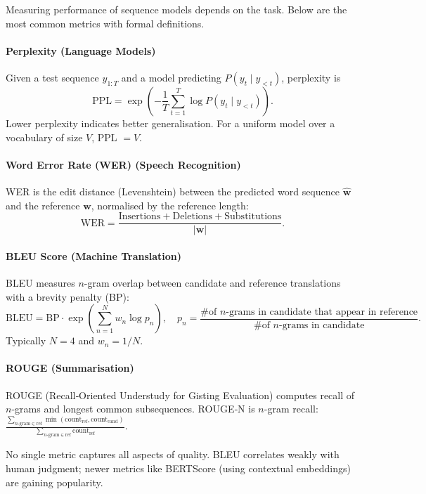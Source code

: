 \documentclass{tufte-handout}
\begin{document}
Measuring performance of sequence models depends on the task. Below are the most common metrics with formal definitions.

\paragraph{Perplexity (Language Models)}
Given a test sequence $y_{1:T}$ and a model predicting $P(y_t \mid y_{<t})$, perplexity is
\[
\text{PPL} = \exp\left(-\frac{1}{T}\sum_{t=1}^T \log P(y_t \mid y_{<t})\right).
\]
Lower perplexity indicates better generalisation. For a uniform model over a vocabulary of size $V$, PPL $= V$.

\paragraph{Word Error Rate (WER) (Speech Recognition)}
WER is the edit distance (Levenshtein) between the predicted word sequence $\hat{\mathbf{w}}$ and the reference $\mathbf{w}$, normalised by the reference length:
\[
\text{WER} = \frac{\text{Insertions} + \text{Deletions} + \text{Substitutions}}{|\mathbf{w}|}.
\]

\paragraph{BLEU Score (Machine Translation)}
BLEU measures $n$-gram overlap between candidate and reference translations with a brevity penalty (BP):
\[
\text{BLEU} = \text{BP} \cdot \exp\left(\sum_{n=1}^N w_n \log p_n\right),\quad
p_n = \frac{\text{\# of $n$-grams in candidate that appear in reference}}{\text{\# of $n$-grams in candidate}}.
\]
Typically $N=4$ and $w_n = 1/N$.

\paragraph{ROUGE (Summarisation)}
ROUGE (Recall‑Oriented Understudy for Gisting Evaluation) computes recall of $n$-grams and longest common subsequences. ROUGE‑N is $n$-gram recall: $\frac{\sum_{n\text{-gram} \in \text{ref}} \min(\text{count}_{\text{ref}}, \text{count}_{\text{cand}})}{\sum_{n\text{-gram} \in \text{ref}} \text{count}_{\text{ref}}}$.

\begin{remark}
    No single metric captures all aspects of quality. BLEU correlates weakly with human judgment; newer metrics like BERTScore (using contextual embeddings) are gaining popularity.
\end{remark}
\end{document}
